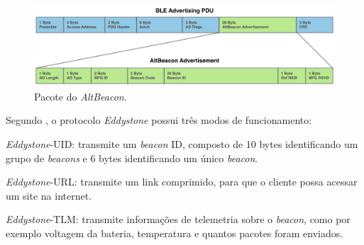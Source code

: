 \begin{figure}[htb]
	\caption{\label{fig:altbeacon-packet}Pacote do \textit{AltBeacon}.}
	\begin{center}
		\includegraphics[width=1\textwidth]{img/altbeacon-packet.png}
	\end{center}
\end{figure}

Segundo , o protocolo \textit{Eddystone} possui três modos de funcionamento:
\begin{alineas}
	\item \textit{Eddystone}-UID: transmite um \textit{beacon} ID, composto de 10 bytes identificando um grupo de \textit{beacons} e  6 bytes identificando um único \textit{beacon}.
	\item \textit{Eddystone}-URL: transmite um link comprimido, para que o cliente possa acessar um site na internet.
	\item \textit{Eddystone}-TLM: transmite informações de telemetria sobre o \textit{beacon}, como por exemplo voltagem da bateria, temperatura e quantos pacotes foram enviados.
\end{alineas}

